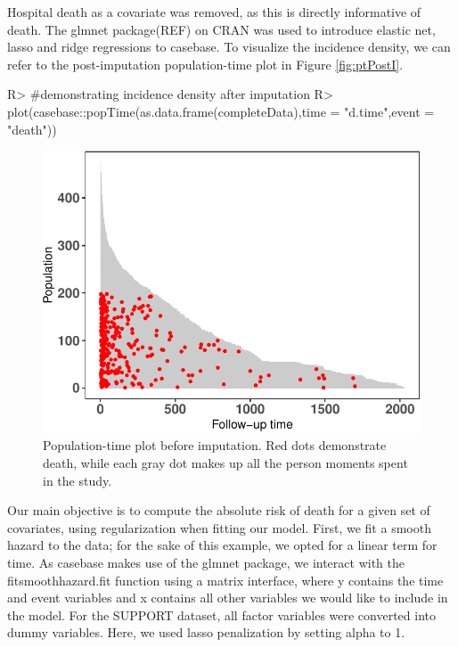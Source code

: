 \documentclass[
]{jss}
\begin{document}
Hospital death as a covariate was removed, as this is directly
informative of death. The glmnet package(REF) on CRAN was used to
introduce elastic net, lasso and ridge regressions to casebase. To
visualize the incidence density, we can refer to the post-imputation
population-time plot in Figure \ref{fig:ptPostI}.

\begin{CodeChunk}

\begin{CodeInput}
R> #demonstrating incidence density after imputation
R> plot(casebase::popTime(as.data.frame(completeData),time = "d.time",event = "death"))
\end{CodeInput}
\begin{figure}

{\centering \includegraphics{../figures/poptimePostImputation-1} 

}

\caption{\label{fig:ptPostI} Population-time plot before imputation. Red dots demonstrate death, while each gray dot makes up all the person moments spent in the study.}\label{fig:poptimePostImputation}
\end{figure}
\end{CodeChunk}

Our main objective is to compute the absolute risk of death for a given
set of covariates, using regularization when fitting our model. First,
we fit a smooth hazard to the data; for the sake of this example, we
opted for a linear term for time. As casebase makes use of the glmnet
package, we interact with the fitsmoothhazard.fit function using a
matrix interface, where y contains the time and event variables and x
contains all other variables we would like to include in the model. For
the SUPPORT dataset, all factor variables were converted into dummy
variables. Here, we used lasso penalization by setting alpha to 1.
\end{document}
